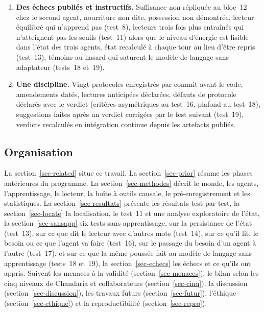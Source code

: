 \documentclass[11pt,a4paper]{article}
\begin{document}
\begin{enumerate}
\og oui \fg{} général qui suit l'état, pas un contenu propre à l'énergie. En séparant
dans l'état la décision du besoin (test~16), une poussée qui ne change presque pas la
décision fait dire \og oui \fg{} autant qu'une poussée qui la change : ce \og oui \fg{}
n'est pas seulement l'annonce de ce que l'agent va faire.
\item \textbf{Des échecs publiés et instructifs.} Suffisance non répliquée au
bloc~12 chez le second agent, nourriture non dite, possession non démontrée,
lecteur équilibré qui n'apprend pas (test~8), lecteurs trois fois plus entraînés
qui n'atteignent pas les seuils (test~11) alors que le niveau d'énergie est lisible
dans l'état des trois agents, état recalculé à chaque tour au lieu d'être repris
(test~13), témoins au hasard qui saturent le modèle de langage sans adaptateur (tests~18
et~19).
\item \textbf{Une discipline.} Vingt protocoles enregistrés par commit avant le
code, amendements datés, lectures anticipées déclarées, défauts de protocole déclarés avec
le verdict (critères asymétriques au test~16, plafond au test~18), suggestions faites après un
verdict corrigées par le test suivant (test~19), verdicts recalculés en intégration continue
depuis les artefacts publiés.
\end{enumerate}

\subsection{Organisation}

La section~\ref{sec-related} situe ce travail. La section~\ref{sec-prior} résume
les phases antérieures du programme. La section~\ref{sec-methodes} décrit le
monde, les agents, l'apprentissage, le lecteur, la boîte à outils causale, le
pré-enregistrement et les statistiques. La section~\ref{sec-resultats} présente
les résultats test par test, la section~\ref{sec-locate} la localisation, le
test~11 et une analyse exploratoire de l'état, la section~\ref{sec-sansapp} six
tests sans apprentissage, sur la persistance de l'état (test~13), sur ce que dit
le lecteur avec d'autres mots (test~14), sur ce qu'il lit, le besoin ou ce que l'agent
va faire (test~16), sur le passage du besoin d'un agent à l'autre (test~17), et sur ce
que la même poussée fait au modèle de langage sans apprentissage (tests~18 et~19), la
section~\ref{sec-echecs} les échecs et ce
qu'ils ont appris.
Suivent les menaces à la validité (section~\ref{sec-menaces}), le bilan selon
les cinq niveaux de Chandaria et collaborateurs (section~\ref{sec-cinq}), la
discussion (section~\ref{sec-discussion}), les travaux futurs
(section~\ref{sec-futur}), l'éthique (section~\ref{sec-ethique}) et la
reproductibilité (section~\ref{sec-repro}).
\end{document}
